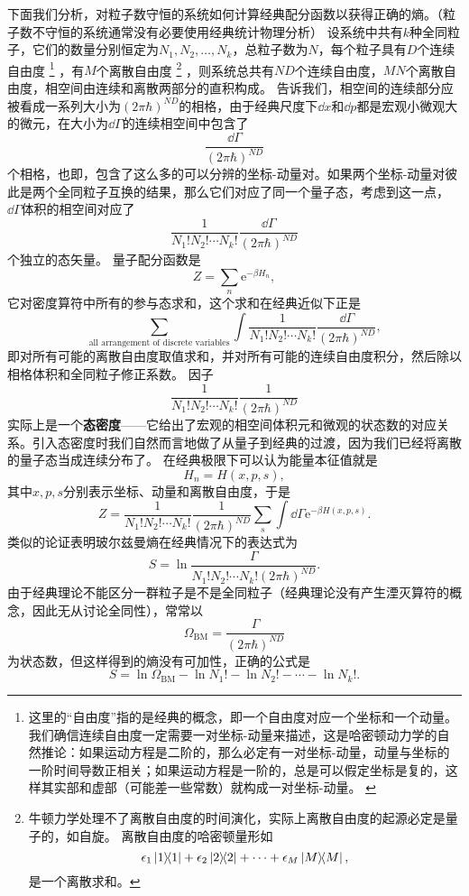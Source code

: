 \documentclass[hyperref, UTF8, a4paper]{ctexart}
\newcommand*{\ee}{\mathrm{e}}
\renewcommand{\autoref}{\prettyref}
\begin{document}
下面我们分析，对粒子数守恒的系统如何计算经典配分函数以获得正确的熵。（粒子数不守恒的系统通常没有必要使用经典统计物理分析）
设系统中共有$k$种全同粒子，它们的数量分别恒定为$N_1, N_2, \ldots, N_k$，总粒子数为$N$，每个粒子具有$D$个连续自由度%
\footnote{这里的“自由度”指的是经典的概念，即一个自由度对应一个坐标和一个动量。
我们确信连续自由度一定需要一对坐标-动量来描述，这是哈密顿动力学的自然推论：如果运动方程是二阶的，那么必定有一对坐标-动量，动量与坐标的一阶时间导数正相关；如果运动方程是一阶的，总是可以假定坐标是复的，这样其实部和虚部（可能差一些常数）就构成一对坐标-动量。
\label{note:degree-of-freedom}
}%
，有$M$个离散自由度
%
\footnote{牛顿力学处理不了离散自由度的时间演化，实际上离散自由度的起源必定是量子的，如自旋。
离散自由度的哈密顿量形如
\[
    \epsilon_1 \dyad{1} + \epsilon_2 \dyad{2} + \cdots + \epsilon_M \dyad{M},
\]
是一个离散求和。
}%
，则系统总共有$ND$个连续自由度，$MN$个离散自由度，相空间由连续和离散两部分的直积构成。
\autoref{sec:back-to-classical}告诉我们，相空间的连续部分应被看成一系列大小为$(2\pi \hbar)^{ND}$的相格，由于经典尺度下$\dd{x}$和$\dd{p}$都是宏观小微观大的微元，在大小为$\dd{\Gamma}$的连续相空间中包含了
\[
    \frac{\dd{\Gamma}}{(2\pi \hbar)^{ND}}
\]
个相格，也即，包含了这么多的可以分辨的坐标-动量对。如果两个坐标-动量对彼此是两个全同粒子互换的结果，那么它们对应了同一个量子态，考虑到这一点，$\dd{\Gamma}$体积的相空间对应了
\[
    \frac{1}{N_1! N_2! \cdots N_k!} \frac{\dd{\Gamma}}{(2\pi \hbar)^{ND}}
\]
个独立的态矢量。
量子配分函数是
\[
    Z = \sum_n \ee^{-\beta H_n},
\]
它对密度算符中所有的参与态求和，这个求和在经典近似下正是
\[
    \sum_\text{all arrangement of discrete variables} \int \frac{1}{N_1! N_2! \cdots N_k!} \frac{\dd{\Gamma}}{(2\pi \hbar)^{ND}},
\]
即对所有可能的离散自由度取值求和，并对所有可能的连续自由度积分，然后除以相格体积和全同粒子修正系数。
因子
\[
    \frac{1}{N_1! N_2! \cdots N_k!} \frac{1}{(2\pi \hbar)^{ND}}
\]
实际上是一个\textbf{态密度}——它给出了宏观的相空间体积元和微观的状态数的对应关系。引入态密度时我们自然而言地做了从量子到经典的过渡，因为我们已经将离散的量子态当成连续分布了。
在经典极限下可以认为能量本征值就是
\[
    H_n = H(x, p, s),
\]
其中$x, p, s$分别表示坐标、动量和离散自由度，于是
\begin{equation}
    Z = \frac{1}{N_1! N_2! \cdots N_k!} \frac{1}{(2\pi \hbar)^{ND}} \sum_{s} \int \dd{\Gamma} \ee^{-\beta H(x, p, s)}.
\end{equation}
类似的论证表明玻尔兹曼熵在经典情况下的表达式为
\begin{equation}
    S = \ln \frac{\Gamma}{N_1! N_2! \cdots N_k! (2\pi\hbar)^{ND}}.
\end{equation}
由于经典理论不能区分一群粒子是不是全同粒子（经典理论没有产生湮灭算符的概念，因此无从讨论全同性），常常以
\begin{equation}
    \Omega_\text{BM} = \frac{\Gamma}{(2\pi\hbar)^{ND}}
\end{equation}
为状态数，但这样得到的熵没有可加性，正确的公式是
\[
    S = \ln \Omega_\text{BM} - \ln N_1! - \ln N_2! - \cdots - \ln N_k!.
\]
\end{document}
